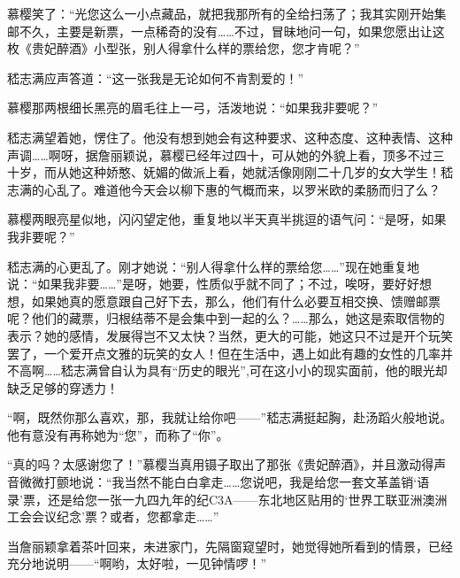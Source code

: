 \par 慕樱笑了：“光您这么一小点藏品，就把我那所有的全给扫荡了；我其实刚开始集邮不久，主要是新票，一点稀奇的没有……不过，冒昧地问一句，如果您愿出让这枚《贵妃醉酒》小型张，别人得拿什么样的票给您，您才肯呢？”
\par 嵇志满应声答道：“这一张我是无论如何不肯割爱的！”
\par 慕樱那两根细长黑亮的眉毛往上一弓，活泼地说：“如果我非要呢？”
\par 嵇志满望着她，愣住了。他没有想到她会有这种要求、这种态度、这种表情、这种声调……啊呀，据詹丽颖说，慕樱已经年过四十，可从她的外貌上看，顶多不过三十岁，而从她这种娇憨、妩媚的做派上看，她就活像刚刚二十几岁的女大学生！嵇志满的心乱了。难道他今天会以柳下惠的气概而来，以罗米欧的柔肠而归了么？
\par 慕樱两眼亮星似地，闪闪望定他，重复地以半天真半挑逗的语气问：“是呀，如果我非要呢？”
\par 嵇志满的心更乱了。刚才她说：“别人得拿什么样的票给您……”现在她重复地说：“如果我非要……”是呀，她要，性质似乎就不同了；不过，唉呀，要好好想想，如果她真的愿意跟自己好下去，那么，他们有什么必要互相交换、馈赠邮票呢？他们的藏票，归根结蒂不是会集中到一起的么？……那么，她这是索取信物的表示？她的感情，发展得岂不又太快？当然，更大的可能，她这只不过是开个玩笑罢了，一个爱开点文雅的玩笑的女人！但在生活中，遇上如此有趣的女性的几率并不高啊……嵇志满曾自认为具有“历史的眼光”,可在这小小的现实面前，他的眼光却缺乏足够的穿透力！
\par “啊，既然你那么喜欢，那，我就让给你吧——”嵇志满挺起胸，赴汤蹈火般地说。他有意没有再称她为“您”，而称了“你”。
\par “真的吗？太感谢您了！”慕樱当真用镊子取出了那张《贵妃醉酒》，并且激动得声音微微打颤地说：“我当然不能白白拿走……您说吧，我是给您一套文革盖销‘语录’票，还是给您一张一九四九年的纪C3A——东北地区贴用的‘世界工联亚洲澳洲工会会议纪念’票？或者，您都拿走……”
\par 当詹丽颖拿着茶叶回来，未进家门，先隔窗窥望时，她觉得她所看到的情景，已经充分地说明——“啊哟，太好啦，一见钟情啰！”


